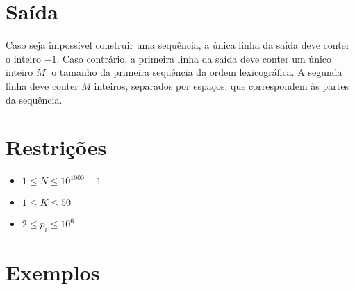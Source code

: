\section*{Saída}

Caso seja impossível construir uma sequência, a única linha da saída deve conter o inteiro $-1$.
Caso contrário, a primeira linha da saída deve conter um único inteiro $M$: o tamanho da primeira sequência da ordem lexicográfica.
A segunda linha deve conter $M$ inteiros, separados por espaços, que correspondem às partes da sequência.
 

\section*{Restrições}

\begin{itemize}
    \item $1 \leq N \leq 10^{1000} - 1$
    \item $1 \leq K \leq 50$
    \item $2 \leq p_i \leq 10^{6}$
\end{itemize}


\section*{Exemplos}

\exemplo
